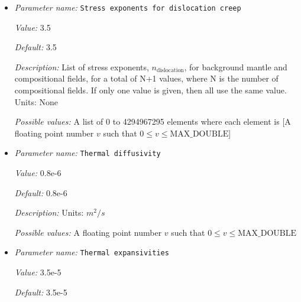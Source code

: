 \begin{itemize}
{\it Default:} 1


{\it Description:} List of stress exponents, $n_{\text{diffusion}}$, for background mantle and compositional fields, for a total of N+1 values, where N is the number of compositional fields. If only one value is given, then all use the same value.  Units: None


{\it Possible values:} A list of 0 to 4294967295 elements where each element is [A floating point number $v$ such that $0 \leq v \leq \text{MAX\_DOUBLE}$]
\item {\it Parameter name:} {\tt Stress exponents for dislocation creep}
\label{parameters:Material model/Diffusion dislocation/Stress exponents for dislocation creep}


{\it Value:} 3.5


{\it Default:} 3.5


{\it Description:} List of stress exponents, $n_{\text{dislocation}}$, for background mantle and compositional fields, for a total of N+1 values, where N is the number of compositional fields. If only one value is given, then all use the same value.  Units: None


{\it Possible values:} A list of 0 to 4294967295 elements where each element is [A floating point number $v$ such that $0 \leq v \leq \text{MAX\_DOUBLE}$]
\item {\it Parameter name:} {\tt Thermal diffusivity}
\label{parameters:Material model/Diffusion dislocation/Thermal diffusivity}


{\it Value:} 0.8e-6


{\it Default:} 0.8e-6


{\it Description:} Units: $m^2/s$


{\it Possible values:} A floating point number $v$ such that $0 \leq v \leq \text{MAX\_DOUBLE}$
\item {\it Parameter name:} {\tt Thermal expansivities}
\label{parameters:Material model/Diffusion dislocation/Thermal expansivities}


{\it Value:} 3.5e-5


{\it Default:} 3.5e-5



\end{itemize}
